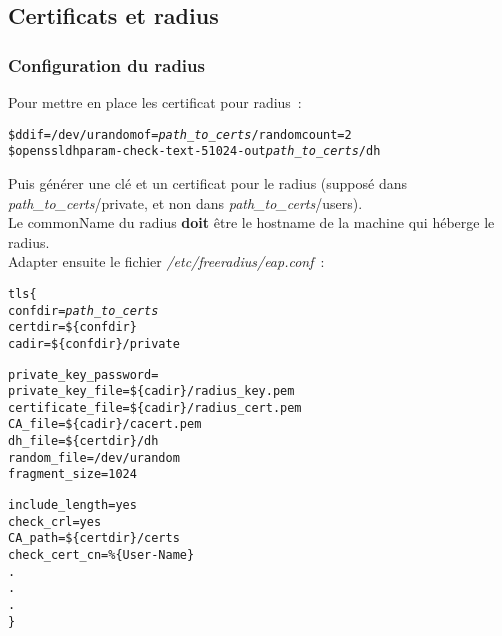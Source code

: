 \subsection{Certificats et radius}
\subsubsection{Configuration du radius}
Pour mettre en place les certificat pour radius~: 
\begin{alltt}
\$ dd if=/dev/urandom of=\emph{path\_to\_certs}/random count=2
\$ openssl dhparam -check -text -5 1024 -out \emph{path\_to\_certs}/dh
\end{alltt}
Puis générer une clé et un certificat pour le radius (supposé dans \emph{path\_to\_certs}/private, et non dans \emph{path\_to\_certs}/users).\\
Le commonName du radius \textbf{doit} être le hostname de la machine qui héberge le radius.\\
Adapter ensuite le fichier \emph{/etc/freeradius/eap.conf}~:
\begin{alltt}
tls \{
	confdir = \emph{path\_to\_certs} 
	certdir = \$\{confdir\}
	cadir = \$\{confdir\}/private

	private_key_password =
	private_key_file = \$\{cadir\}/radius_key.pem
	certificate_file = \$\{cadir\}/radius_cert.pem
	CA_file = \$\{cadir\}/cacert.pem
	dh_file = \$\{certdir\}/dh
	random_file = /dev/urandom
	fragment_size = 1024

	include_length = yes
	check_crl = yes
	CA_path = \$\{certdir\}/certs
	check_cert_cn = \%\{User-Name\}
	.
	.
	.
\}
\end{alltt}
